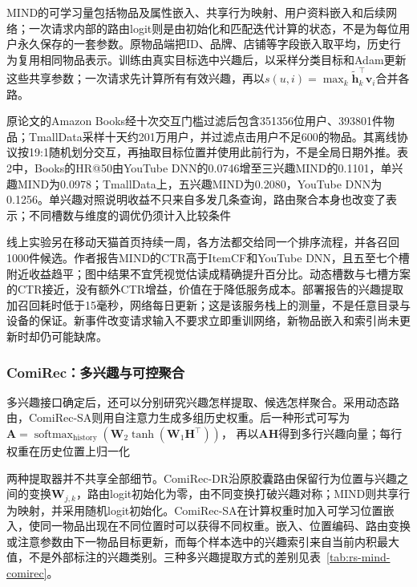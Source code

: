 MIND的可学习量包括物品及属性嵌入、共享行为映射、用户资料嵌入和后续网络；一次请求内部的路由logit则是由初始化和匹配迭代计算的状态，不是为每位用户永久保存的一套参数。原物品端把ID、品牌、店铺等字段嵌入取平均，历史行为复用相同物品表示。训练由真实目标选中兴趣后，以采样分类目标和Adam更新这些共享参数；一次请求先计算所有有效兴趣，再以$s(u,i)=\max_k\widetilde{\bm h}_k^\top\bm v_i$合并各路。

原论文的Amazon Books经十次交互门槛过滤后包含351356位用户、393801件物品；TmallData采样十天约201万用户，并过滤点击用户不足600的物品。其离线协议按19:1随机划分交互，再抽取目标位置并使用此前行为，不是全局日期外推。表2中，Books的HR@50由YouTube DNN的0.0746增至三兴趣MIND的0.1101，单兴趣MIND为0.0978；TmallData上，五兴趣MIND为0.2080，YouTube DNN为0.1256。单兴趣对照说明收益不只来自多发几条查询，路由聚合本身也改变了表示；不同槽数与维度的调优仍须计入比较条件

线上实验另在移动天猫首页持续一周，各方法都交给同一个排序流程，并各召回1000件候选。作者报告MIND的CTR高于ItemCF和YouTube DNN，且五至七个槽附近收益趋平；图中结果不宜凭视觉估读成精确提升百分比。动态槽数与七槽方案的CTR接近，没有额外CTR增益，价值在于降低服务成本。部署报告的兴趣提取加召回耗时低于15毫秒，网络每日更新；这是该服务栈上的测量，不是任意目录与设备的保证。新事件改变请求输入不要求立即重训网络，新物品嵌入和索引尚未更新时却仍可能缺席。

\subsubsection{ComiRec：多兴趣与可控聚合}
\label{sec:rs-comirec}

多兴趣接口确定后，还可以分别研究兴趣怎样提取、候选怎样聚合。采用动态路由，ComiRec-SA则用自注意力生成多组历史权重。后一种形式可写为
$\bm A=\operatorname{softmax}_{\mathrm{history}}(\bm W_2\tanh(\bm W_1\bm H^\top))$，
再以$\bm A\bm H$得到多行兴趣向量；每行权重在历史位置上归一化

两种提取器并不共享全部细节。ComiRec-DR沿原胶囊路由保留行为位置与兴趣之间的变换$\bm W_{j,k}$，路由logit初始化为零，由不同变换打破兴趣对称；MIND则共享行为映射，并采用随机logit初始化。ComiRec-SA在计算权重时加入可学习位置嵌入，使同一物品出现在不同位置时可以获得不同权重。嵌入、位置编码、路由变换或注意参数由下一物品目标更新，而每个样本选中的兴趣索引来自当前内积最大值，不是外部标注的兴趣类别。三种多兴趣提取方式的差别见表~\ref{tab:rs-mind-comirec}。

